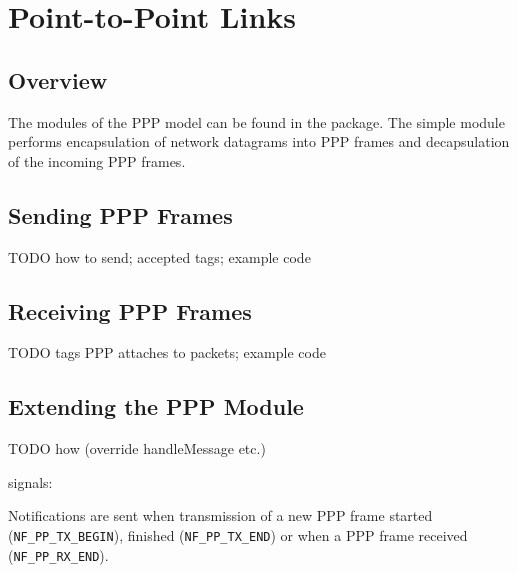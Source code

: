 \chapter{Point-to-Point Links}
\label{cha:ppp}


\section{Overview}

The modules of the PPP model can be found in the 
package. The  simple module performs encapsulation
of network datagrams into PPP frames and decapsulation of
the incoming PPP frames.

\section{Sending PPP Frames}

TODO how to send; accepted tags; example code

\section{Receiving PPP Frames}

TODO tags PPP attaches to packets; example code

\section{Extending the PPP Module}

TODO how (override handleMessage etc.)

signals:

Notifications are sent when
transmission of a new PPP frame started (\verb!NF_PP_TX_BEGIN!), finished
(\verb!NF_PP_TX_END!) or when a PPP frame received (\verb!NF_PP_RX_END!).

